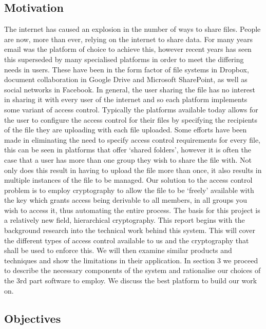 \documentclass[12pt, titlepage]{article}
\begin{document}
\subsection{Motivation}
The internet has caused an explosion in the number of ways to share files. People are now, more than ever, relying on the internet to share data. For many years email was the platform of choice to achieve this, however recent years has seen this superseded by many specialised platforms in order to meet the differing needs in users. These have been in the form factor of file systems in Dropbox, document collaboration in Google Drive and Microsoft SharePoint, as well as social networks in Facebook. In general, the user sharing the file has no interest in sharing it with every user of the internet and so each platform implements some variant of access control. Typically the platforms available today allows for the user to configure the access control for their files by specifying the recipients of the file they are uploading with each file uploaded. Some efforts have been made in eliminating the need to specify access control requirements for every file, this can be seen in platforms that offer `shared folders', however it is often the case that a user has more than one group they wish to share the file with. Not only does this result in having to upload the file more than once, it also results in multiple instances of the file to be managed. Our solution to the access control problem is to employ cryptography to allow the file to be `freely' available with the key which grants access being derivable to all members, in all groups you wish to access it, thus automating the entire process.
\newline \indent The basis for this project is a relatively new field, hierarchical cryptography.
\newline
\newline \indent This report begins with the background research into the technical work behind this system. This will cover the different types of access control available to us and the cryptography that shall be used to enforce this. We will then examine similar products and techniques and show the limitations in their application. In section 3 we proceed to describe the necessary components of the system and rationalise our choices of the 3rd part software to employ. We discuss the best platform to build our work on.

\subsection{Objectives}
\end{document}
